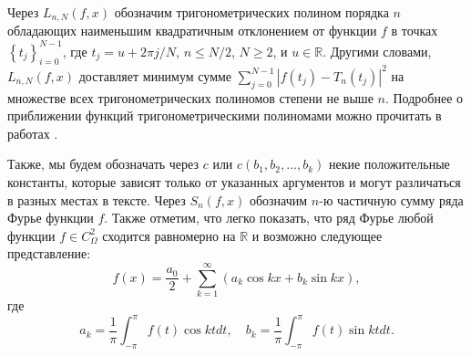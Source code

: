 Через $L_{n,N}(f,x)$ обозначим
тригонометрических полином порядка $n$ обладающих наименьшим квадратичным отклонением от функции $f$ в точках $\left\{t_{j}\right\} _{i=0}^{N-1}$,
где $t_{j}=u+2\pi j / N$, $n \leq N/2$, $N \geq 2$, и $u \in \mathbb{R}$. 
Другими словами, $L_{n,N}(f,x)$ доставляет минимум сумме 
$
\sum_{j=0}^{N-1}\left|f(t_{j})-T_{n}(t_{j})\right|^{2}
$
на множестве всех тригонометрических полиномов степени не выше $n$. 
Подробнее о приближении функций тригонометрическими полиномами можно прочитать в работах 
\cite{2_bernstein,4_erdos,7_kalashnikov,8_krilov,9_marcinkiewicz,10_marcinkiewicz,11_natanson,12_nikolsky,18_zigmund,17_turetsky}.

Также, мы будем обозначать через $c$ или $c(b_1, b_2, \ldots, b_k)$ некие положительные константы, которые зависят только от указанных аргументов и могут 
различаться в разных местах в тексте.  Через $S_n(f,x)$ обозначим $n$-ю частичную сумму ряда Фурье функции $f$. 
Также отметим, что легко показать, что ряд Фурье любой функции $f \in C_\Omega^{2}$ 
сходится равномерно на $\mathbb{R}$ и возможно следующее представление:
\begin{equation}\label{f_as_Fourier}
f(x) = \frac{a_0}{2} + \sum_{k=1}^{\infty} \left(a_k \cos kx + b_k \sin kx\right),
\end{equation} 
где
\begin{equation}\label{akbk_definition}
a_k = \frac1\pi \int_{-\pi}^{\pi} f(t) \cos kt dt,\quad b_k = \frac1\pi \int_{-\pi}^{\pi} f(t) \sin kt dt.
\end{equation}


